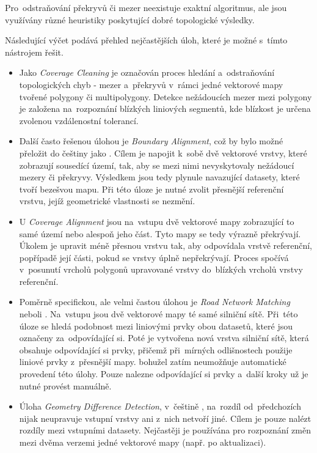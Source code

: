 Pro~odstraňování překryvů či mezer neexistuje exaktní algoritmus,
ale jsou vy\-užívány různé heuristiky poskytující dobré topologické výsledky.

Následující výčet podává přehled nejčastějších úloh, které je možné 
s~tímto nástrojem řešit.

\begin{itemize}
 \item Jako \textit{Coverage Cleaning} je  označován proces hledání
    a~odstraňování topologických chyb - mezer a~překryvů v~rámci jedné
    vektorové mapy tvořené polygony či multipolygony. Detekce nežádoucích
    mezer mezi polygony je založena na~rozpoznání blízkých liniových segmentů,
    kde blízkost je určena zvolenou vzdálenostní to\-le\-rancí. 

 \item Další často řešenou úlohou je \textit{Boundary Alignment}, což by
    bylo možné přeložit do češtiny jako . 
    Cílem je napojit k~sobě dvě vektorové vrstvy, které zobrazují sousedící
    území, tak, aby se mezi nimi nevyskytovaly nežádoucí mezery či překryvy.
    Výsledkem jsou tedy plynule navazující datasety, které tvoří bezešvou mapu.
    Při této úloze je nutné zvolit přesnější referenční vrstvu, jejíž 
    geometrické vlastnosti se nezmění.

 \item U \textit{Coverage Alignment} jsou na~vstupu dvě vektorové
    mapy zobrazující to samé území nebo alespoň jeho část. Tyto mapy se 
    tedy výrazně překrývají. Úkolem je upravit méně přesnou vrstvu tak,
    aby odpovídala vrstvě referenční, popřípadě její části, pokud se vrstvy
    úplně nepřekrývají. Proces spočívá v~posunutí vrcholů polygonů upravované
    vrstvy do~blízkých vrcholů vrstvy referenční.

 \item Poměrně specifickou, ale velmi častou úlohou je \textit{Road Network 
    Matching} neboli . Na~vstupu jsou dvě 
    vektorové mapy té samé silniční sítě. Při~této úloze se hledá podobnost
    mezi liniovými prvky obou datasetů, které jsou označeny za~odpovídající si.
    Poté je vytvořena nová vrstva silniční sítě, která obsahuje odpovídající
    si prvky, přičemž při~mírných odlišnostech použije liniové prvky z~přesnější
    mapy.  bohužel zatím neumožňuje automatické provedení této
    úlohy. Pouze nalezne odpovídající si prvky a~další kroky už je nutné provést
    manuálně.

\item Úloha \textit{Geometry Difference Detection}, v~češtině , na~roz\-díl od~předchozích nijak neupravuje vstupní
    vrstvy ani z~nich netvoří jiné. Cílem je pouze nalézt rozdíly mezi vstupními
    datasety. Nejčastěji je používána pro rozpoznání změn mezi dvěma verzemi
    jedné vektorové mapy (např. po aktualizaci).
\end{itemize}

